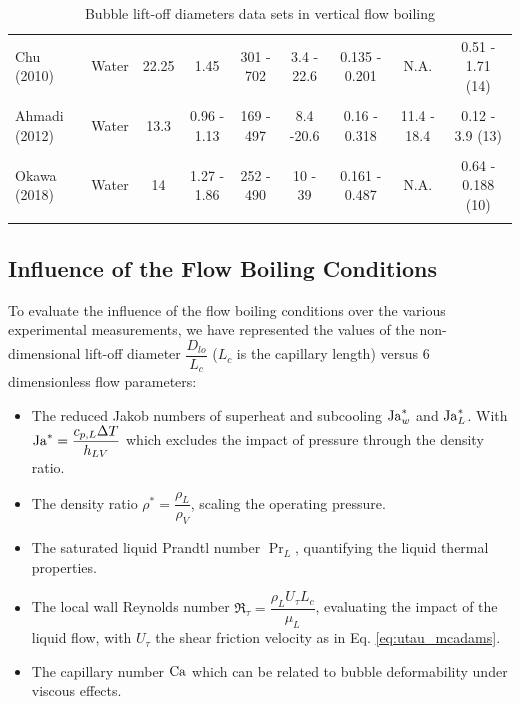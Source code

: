\begin{table}[h!]
{\begin{tabular}{p{20mm}|c c c c c c c c}
\\
Chu \cite{chu_bubble_2011} \newline (2010) & Water & 22.25 & 1.45 & 301 - 702 & 3.4 - 22.6 & 0.135 - 0.201 &  N.A. & 0.51 - 1.71 (14) \\
\\
Ahmadi \cite{ahmadi_bubble_2012} \newline (2012) & Water & 13.3 & 0.96 - 1.13 & 169 - 497 & 8.4 -20.6 & 0.16 - 0.318 &  11.4 - 18.4 & 0.12 - 3.9 (13) \\
\\
Okawa \cite{okawa_observation_2018} \newline (2018) & Water & 14 & 1.27 - 1.86 & 252 - 490 & 10 - 39 & 0.161 - 0.487 &  N.A. & 0.64 - 0.188 (10) \\
\\
\hline
\end{tabular}
}


\caption{Bubble lift-off diameters data sets in vertical flow boiling}
\label{tab:exp_data_dlo}


\end{table}

\subsection{Influence of the Flow Boiling Conditions}


To evaluate the influence of the flow boiling conditions over the various experimental measurements, we have represented the values of the non-dimensional lift-off diameter $\dfrac{D_{lo}}{L_{c}}$ ($L_{c}$ is the capillary length) versus 6 dimensionless flow parameters:

\begin{itemize}
\item The reduced Jakob numbers of superheat and subcooling $\mathrm{Ja}_{w}^{*}$ and $\mathrm{Ja}_{L}^{*}$. With $\mathrm{Ja}^{*} = \dfrac{c_{p,L}\Delta T}{h_{LV}}$ which excludes the impact of pressure through the density ratio.

\item The density ratio $\rho^{*} = \dfrac{\rho_{L}}{\rho_{V}}$, scaling the operating pressure.

\item The saturated liquid Prandtl number $\Pr_{L}$, quantifying the liquid thermal properties.

\item The local wall Reynolds number $\Re_{\tau} = \dfrac{\rho_{L}U_{\tau}L_{c}}{\mu_{L}}$, evaluating the impact of the liquid flow, with $U_{\tau}$ the shear friction velocity as in Eq. \ref{eq:utau_mcadams}.

\item The capillary number $\mathrm{Ca}$ which can be related to bubble deformability under viscous effects.
\end{itemize}


